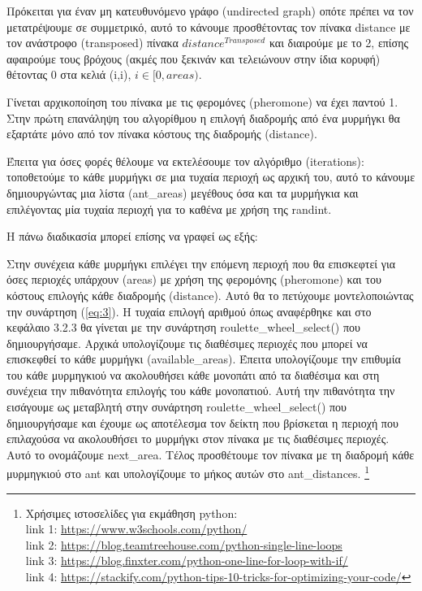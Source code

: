 Πρόκειται για έναν μη κατευθυνόμενο γράφο (undirected graph) οπότε πρέπει να τον μετατρέψουμε σε συμμετρικό, αυτό το κάνουμε προσθέτοντας τον πίνακα distance με τον ανάστροφο (transposed) πίνακα $distance^{Transposed}$ και διαιρούμε με το 2, επίσης αφαιρούμε τους βρόχους (ακμές που ξεκινάν και τελειώνουν στην ίδια κορυφή) θέτοντας 0 στα κελιά (i,i), $i\in[0,areas)$. \cite{perez2020introduction}


Γίνεται αρχικοποίηση του πίνακα με τις φερομόνες (pheromone) να έχει παντού 1. Στην πρώτη επανάληψη του αλγορίθμου η επιλογή διαδρομής από ένα μυρμήγκι θα εξαρτάτε μόνο από τον πίνακα κόστους της διαδρομής (distance). 


Έπειτα για όσες φορές θέλουμε να εκτελέσουμε τον αλγόριθμο (iterations):
τοποθετούμε το κάθε μυρμήγκι σε μια τυχαία περιοχή ως αρχική του, αυτό το κάνουμε δημιουργώντας μια λίστα (ant\_areas) μεγέθους όσα και τα μυρμήγκια και επιλέγοντας μία τυχαία περιοχή για το καθένα με χρήση της randint. \cite{w3school}

Η πάνω διαδικασία μπορεί επίσης να γραφεί ως εξής: 


Στην συνέχεια κάθε μυρμήγκι επιλέγει την επόμενη περιοχή που θα επισκεφτεί για όσες περιοχές υπάρχουν (areas) με χρήση της φερομόνης (pheromone) και του κόστους επιλογής κάθε διαδρομής (distance). Αυτό θα το πετύχουμε μοντελοποιώντας την συνάρτηση (\ref{eq:3}). Η τυχαία επιλογή αριθμού όπως αναφέρθηκε και στο κεφάλαιο 3.2.3 θα γίνεται με την συνάρτηση roulette\_wheel\_select() που δημιουργήσαμε. 
Αρχικά υπολογίζουμε τις διαθέσιμες περιοχές που μπορεί να επισκεφθεί το κάθε μυρμήγκι (available\_areas). Έπειτα υπολογίζουμε την επιθυμία του κάθε μυρμηγκιού να ακολουθήσει κάθε μονοπάτι από τα διαθέσιμα και στη συνέχεια την πιθανότητα επιλογής του κάθε μονοπατιού. Αυτή την πιθανότητα την εισάγουμε ως μεταβλητή στην συνάρτηση roulette\_wheel\_select() που δημιουργήσαμε και έχουμε ως αποτέλεσμα τον δείκτη που βρίσκεται η περιοχή που επιλαχούσα να ακολουθήσει το μυρμήγκι στον πίνακα με τις διαθέσιμες περιοχές. Αυτό το ονομάζουμε next\_area. Τέλος προσθέτουμε τον πίνακα με τη διαδρομή κάθε μυρμηγκιού στο ant και υπολογίζουμε το μήκος αυτών στο ant\_distances. \footnote{Xρήσιμες ιστοσελίδες για εκμάθηση python: \\
link 1: \url{https://www.w3schools.com/python/}\\
link 2: \url{https://blog.teamtreehouse.com/python-single-line-loops} \\
link 3: \url{https://blog.finxter.com/python-one-line-for-loop-with-if/}\\
link 4: \url{https://stackify.com/python-tips-10-tricks-for-optimizing-your-code/}
}


